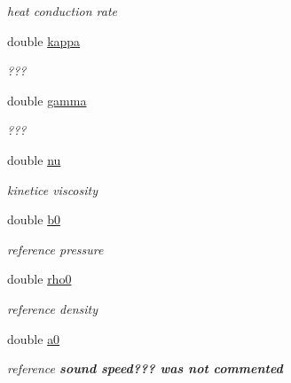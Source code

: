\begin{CompactItemize}
\begin{CompactList}\small\item\em heat conduction rate \item\end{CompactList}\item 
\hypertarget{classMaterial_2444df069ed1e68eea1aead044e47847}{
double \hyperlink{classMaterial_2444df069ed1e68eea1aead044e47847}{kappa}}
\label{classMaterial_2444df069ed1e68eea1aead044e47847}

\begin{CompactList}\small\item\em ??? \item\end{CompactList}\item 
\hypertarget{classMaterial_fcbe6b9bc1cffe3105bdfbf593834e37}{
double \hyperlink{classMaterial_fcbe6b9bc1cffe3105bdfbf593834e37}{gamma}}
\label{classMaterial_fcbe6b9bc1cffe3105bdfbf593834e37}

\begin{CompactList}\small\item\em ??? \item\end{CompactList}\item 
\hypertarget{classMaterial_3da7d0218fcd6369d0bdbb7f91280664}{
double \hyperlink{classMaterial_3da7d0218fcd6369d0bdbb7f91280664}{nu}}
\label{classMaterial_3da7d0218fcd6369d0bdbb7f91280664}

\begin{CompactList}\small\item\em kinetice viscosity \item\end{CompactList}\item 
\hypertarget{classMaterial_9ead67ba9a2882dabf61b6a5e501c8a9}{
double \hyperlink{classMaterial_9ead67ba9a2882dabf61b6a5e501c8a9}{b0}}
\label{classMaterial_9ead67ba9a2882dabf61b6a5e501c8a9}

\begin{CompactList}\small\item\em reference pressure \item\end{CompactList}\item 
\hypertarget{classMaterial_80c74d0a402e1150466fb3d350c81e61}{
double \hyperlink{classMaterial_80c74d0a402e1150466fb3d350c81e61}{rho0}}
\label{classMaterial_80c74d0a402e1150466fb3d350c81e61}

\begin{CompactList}\small\item\em reference density \item\end{CompactList}\item 
\hypertarget{classMaterial_c6109a2fded5aa9c518b2d5271fc7d76}{
double \hyperlink{classMaterial_c6109a2fded5aa9c518b2d5271fc7d76}{a0}}
\label{classMaterial_c6109a2fded5aa9c518b2d5271fc7d76}

\begin{CompactList}\small\item\em reference {\bf sound speed??? was not commented} \item\end{CompactList}\end{CompactItemize}
